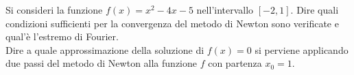 Si consideri la funzione $f(x)=x^2-4x-5$ nell'intervallo $[-2, 1]$. 
Dire quali condizioni sufficienti per la convergenza del metodo 
di Newton sono verificate e qual'\`{e} l'estremo di Fourier.\\

\noindent Dire a quale approssimazione della soluzione di $f(x)=0$ 
si perviene applicando due passi del metodo di Newton alla 
funzione $f$ con partenza $x_0=1$.


